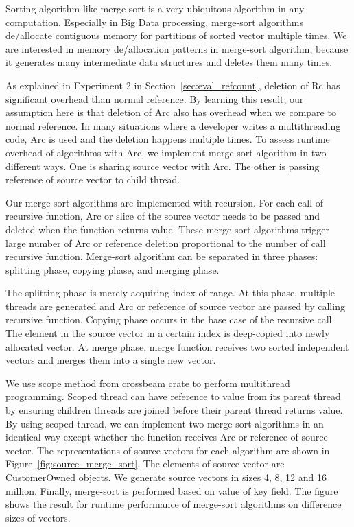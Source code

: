 Sorting algorithm like merge-sort is a very ubiquitous algorithm in any computation. 
Especially in Big Data processing, merge-sort algorithms de/allocate contiguous memory for partitions of sorted vector multiple times.
We are interested in memory de/allocation patterns in merge-sort algorithm, because it generates many intermediate data structures and deletes them many times.

As explained in Experiment 2 in Section~\ref{sec:eval_refcount}, deletion of Rc has significant overhead than normal reference. 
By learning this result, our assumption here is that deletion of Arc also has overhead when we compare to normal reference. 
In many situations where a developer writes a multithreading code, Arc is used and the deletion happens multiple times. 
To assess runtime overhead of algorithms with Arc, we implement merge-sort algorithm in two different ways. 
One is sharing source vector with Arc. The other is passing reference of source vector to child thread. 

Our merge-sort algorithms are implemented with recursion. For each call of recursive function, 
Arc or slice of the source vector needs to be passed and deleted when the function returns value. 
These merge-sort algorithms trigger large number of Arc or reference deletion proportional to the number of call recursive function.
Merge-sort algorithm can be separated in three phases: splitting phase, copying phase, and merging phase. 

The splitting phase is merely acquiring index of range. At this phase, multiple threads are generated and Arc or reference of source vector are passed by calling recursive function. 
Copying phase occurs in the base case of the recursive call. The element in the source vector in a certain index is deep-copied into newly allocated vector.
At merge phase, merge function receives two sorted independent vectors and merges them into a single new vector.

We use scope method from crossbeam crate to perform multithread programming. 
Scoped thread can have reference to value from its parent thread by ensuring children threads are joined before their parent thread returns value. 
By using scoped thread, we can implement two merge-sort algorithms in an identical way except whether the function receives Arc or reference of source vector.
The representations of source vectors for each algorithm are shown in Figure~\ref{fig:source_merge_sort}.
The elements of source vector are CustomerOwned objects. We generate source vectors in sizes 4, 8, 12 and 16 million.
Finally, merge-sort is performed based on value of key field. The figure shows the result for runtime performance of merge-sort algorithms on difference sizes of vectors. 
 
